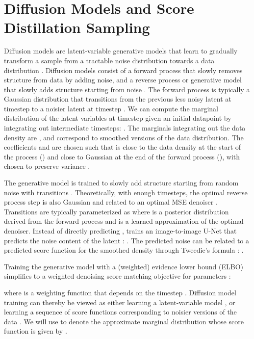 \documentclass{article} \usepackage{iclr2023_conference,times}
\begin{document}
\section{Diffusion Models and Score Distillation Sampling}
\label{sec:diffusion_and_sds}

Diffusion models 
are latent-variable generative models that learn to gradually transform a sample from a tractable noise distribution towards a data distribution \citep{pmlr-v37-sohl-dickstein15, ddpm}. Diffusion models consist of a forward process  that slowly removes structure from data  by adding noise, and a reverse process or generative model  that slowly adds structure starting from noise .  The forward process is typically a Gaussian distribution that transitions from the previous less noisy latent at timestep  to a noisier latent at timestep .
We can compute the marginal distribution of the latent variables at timestep  given an initial datapoint  by integrating out intermediate timesteps: . The marginals integrating out the data density  are  , and correspond to smoothed versions of the data distribution. The coefficients  and  are chosen such that  is close to the data density at the start of the process () and close to Gaussian at the end of the forward process (), with  chosen to preserve variance \citep{kingma2021on,scoresde}.

The generative model  is trained to slowly add structure starting from random noise  with transitions . Theoretically, with enough timesteps, the optimal reverse process step is also Gaussian and related to an optimal MSE denoiser \citep{pmlr-v37-sohl-dickstein15}. Transitions are typically parameterized as  where  is a posterior distribution derived from the forward process and   is a learned approximation of the optimal denoiser. Instead of directly predicting , \citet{ddpm} trains an image-to-image U-Net  that predicts the noise content of the latent : .
The predicted noise can be related to a predicted score function for the smoothed density  through Tweedie's formula \citep{Robbins1992}:
. 

Training the generative model with a (weighted) evidence lower bound (ELBO) simplifies to a weighted denoising score matching objective for parameters  \citep{ddpm,kingma2021on}:

where  is a weighting function that depends on the timestep .
Diffusion model training can thereby be viewed as either learning a latent-variable model \citep{pmlr-v37-sohl-dickstein15,ddpm}, or learning a sequence of score functions corresponding to noisier versions of the data \citep{vincent2011connection, song2019gradients,scoresde}. We will use  to denote the approximate marginal distribution whose score function is given by .
\end{document}
